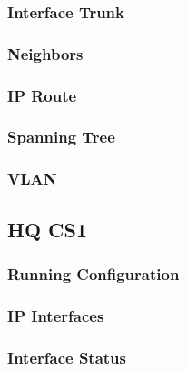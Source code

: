 \subsubsection{Interface Trunk}


\subsubsection{Neighbors}


\subsubsection{IP Route}


\subsubsection{Spanning Tree}


\subsubsection{VLAN}




\subsection{HQ CS1}
\subsubsection{Running Configuration}


\subsubsection{IP Interfaces}


\subsubsection{Interface Status}


